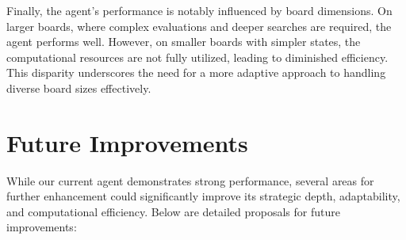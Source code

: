 \documentclass[11pt]{article}
\begin{document}
Finally, the agent's performance is notably influenced by board dimensions. On larger boards, where complex evaluations and deeper searches are required, the agent performs well. However, on smaller boards with simpler states, the computational resources are not fully utilized, leading to diminished efficiency. This disparity underscores the need for a more adaptive approach to handling diverse board sizes effectively.


\section*{Future Improvements}
While our current agent demonstrates strong performance, several areas for further enhancement could significantly improve its strategic depth, adaptability, and computational efficiency. Below are detailed proposals for future improvements:
\end{document}
